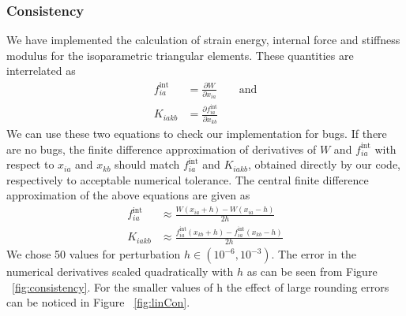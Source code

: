 \documentclass[../main.tex]{subfiles}
\begin{document}
\subsubsection{Consistency}
We have implemented the calculation of strain energy, internal force
and stiffness modulus for the isoparametric triangular elements. These
quantities are interrelated as
\begin{align*}
  f^{\text{int}}_{ia} &= \frac{\partial W}{\partial x_{ia}} \qquad \text{and}\\[5pt]
  K_{iakb} &= \frac{\partial f^{\text{int}}_{ia}}{\partial x_{kb}}
\end{align*}
We can use these two equations to check our implementation for
bugs. If there are no bugs, the finite difference approximation of
derivatives of $W$ and $f^{\text{int}}_{ia}$ with respect to $x_{ia}$
and $x_{kb}$ should match $f^{\text{int}}_{ia}$ and $K_{iakb}$,
obtained directly by our code, respectively to acceptable numerical
tolerance. The central finite difference approximation of the above
equations are given as
\begin{align*}
  f^{\text{int}}_{ia} &\approx \frac{W(x_{ia}+h) - W(x_{ia}-h)}{2h} \\[5pt]
  K_{iakb} &\approx \frac{f^{\text{int}}_{ia}(x_{kb}+h)-f^{\text{int}}_{ia}(x_{kb}-h)}{2h}
\end{align*}
We chose 50 values for perturbation $h \in (10^{-6},10^{-3})$. The
error in the numerical derivatives scaled quadratically with $h$ as
can be seen from Figure ~\ref{fig:consistency}. For the smaller values
of h the effect of large rounding errors can be noticed in Figure
~\ref{fig:linCon}.
\end{document}
